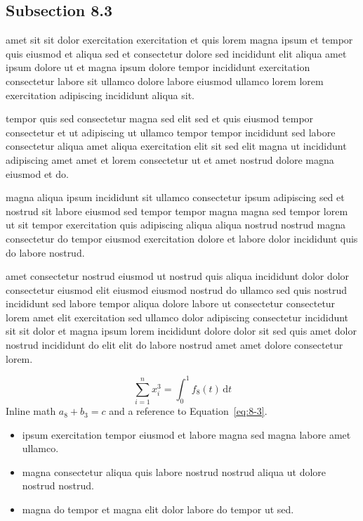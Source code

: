 \documentclass{article}
\begin{document}
\subsection{Subsection 8.3}\label{sec:8-3}
amet sit sit dolor exercitation exercitation et quis lorem magna ipsum et tempor quis eiusmod et aliqua sed et consectetur dolore sed incididunt elit aliqua amet ipsum dolore ut et magna ipsum dolore tempor incididunt exercitation consectetur labore sit ullamco dolore labore eiusmod ullamco lorem lorem exercitation adipiscing incididunt aliqua sit.

tempor quis sed consectetur magna sed elit sed et quis eiusmod tempor consectetur et ut adipiscing ut ullamco tempor tempor incididunt sed labore consectetur aliqua amet aliqua exercitation elit sit sed elit magna ut incididunt adipiscing amet amet et lorem consectetur ut et amet nostrud dolore magna eiusmod et do.

magna aliqua ipsum incididunt sit ullamco consectetur ipsum adipiscing sed et nostrud sit labore eiusmod sed tempor tempor magna magna sed tempor lorem ut sit tempor exercitation quis adipiscing aliqua aliqua nostrud nostrud magna consectetur do tempor eiusmod exercitation dolore et labore dolor incididunt quis do labore nostrud.

amet consectetur nostrud eiusmod ut nostrud quis aliqua incididunt dolor dolor consectetur eiusmod elit eiusmod eiusmod nostrud do ullamco sed quis nostrud incididunt sed labore tempor aliqua dolore labore ut consectetur consectetur lorem amet elit exercitation sed ullamco dolor adipiscing consectetur incididunt sit sit dolor et magna ipsum lorem incididunt dolore dolor sit sed quis amet dolor nostrud incididunt do elit elit do labore nostrud amet amet dolore consectetur lorem.

\begin{equation}\label{eq:8-3}
  \sum_{i=1}^{n} x_i^{3} = \int_0^1 f_{8}(t)\,\mathrm{d}t
\end{equation}
Inline math $a_{8} + b_{3} = c$ and a reference to Equation~\eqref{eq:8-3}.

\begin{itemize}
  \item ipsum exercitation tempor eiusmod et labore magna sed magna labore amet ullamco.
  \item magna consectetur aliqua quis labore nostrud nostrud aliqua ut dolore nostrud nostrud.
  \item magna do tempor et magna elit dolor labore do tempor ut sed.
\end{itemize}
\end{document}
